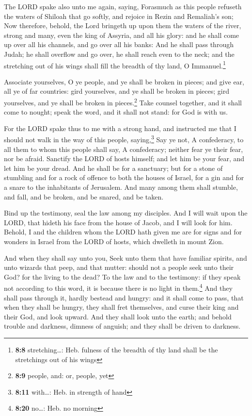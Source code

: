  The LORD spake also unto me again, saying, 
Forasmuch as this people refuseth the waters of Shiloah that go softly,
and rejoice in Rezin and Remaliah's son;  Now therefore,
behold, the Lord bringeth up upon them the waters of the river, strong
and many, even the king of Assyria, and all his glory: and he shall come
up over all his channels, and go over all his banks:  And
he shall pass through Judah; he shall overflow and go over, he shall
reach even to the neck; and the stretching out of his wings shall fill
the breadth of thy land, O Immanuel.\footnote{\textbf{8:8}
  stretching\ldots: Heb. fulness of the breadth of thy land shall be the
  stretchings out of his wings}

 Associate yourselves, O ye people, and ye shall be broken
in pieces; and give ear, all ye of far countries: gird yourselves, and
ye shall be broken in pieces; gird yourselves, and ye shall be broken in
pieces.\footnote{\textbf{8:9} people, and: or, people, yet}
 Take counsel together, and it shall come to nought;
speak the word, and it shall not stand: for God is with us.

 For the LORD spake thus to me with a strong hand, and
instructed me that I should not walk in the way of this people,
saying,\footnote{\textbf{8:11} with\ldots: Heb. in strength of hand}
 Say ye not, A confederacy, to all them to whom this
people shall say, A confederacy; neither fear ye their fear, nor be
afraid.  Sanctify the LORD of hosts himself; and let him
be your fear, and let him be your dread.  And he shall be
for a sanctuary; but for a stone of stumbling and for a rock of offence
to both the houses of Israel, for a gin and for a snare to the
inhabitants of Jerusalem.  And many among them shall
stumble, and fall, and be broken, and be snared, and be taken.

 Bind up the testimony, seal the law among my disciples.
 And I will wait upon the LORD, that hideth his face from
the house of Jacob, and I will look for him.  Behold, I
and the children whom the LORD hath given me are for signs and for
wonders in Israel from the LORD of hosts, which dwelleth in mount Zion.

 And when they shall say unto you, Seek unto them that
have familiar spirits, and unto wizards that peep, and that mutter:
should not a people seek unto their God? for the living to the dead?
 To the law and to the testimony: if they speak not
according to this word, it is because there is no light in
them.\footnote{\textbf{8:20} no\ldots: Heb. no morning} 
And they shall pass through it, hardly bestead and hungry: and it shall
come to pass, that when they shall be hungry, they shall fret
themselves, and curse their king and their God, and look upward.
 And they shall look unto the earth; and behold trouble
and darkness, dimness of anguish; and they shall be driven to darkness.


